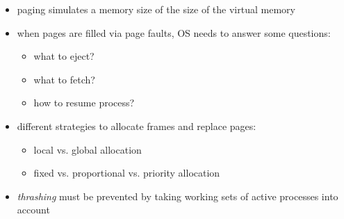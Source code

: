 \begin{summary}
  \begin{itemize}
    \item paging simulates a memory size of the size of the virtual memory
    \item when pages are filled via page faults, OS needs to answer some questions:
    \begin{itemize}
      \item what to eject?
      \item what to fetch?
      \item how to resume process?
    \end{itemize}
    \item different strategies to allocate frames and replace pages:
    \begin{itemize}
      \item local vs. global allocation
      \item fixed vs. proportional vs. priority allocation
    \end{itemize}
    \item \emph{thrashing} must be prevented by taking working sets of active processes into account
  \end{itemize}
\end{summary}
